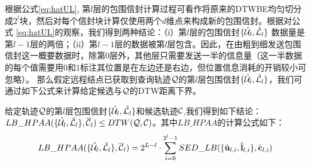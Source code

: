 根据公式\ref{eq:hatUL}, 第$l$层的包围信封计算过程可看作将原来的DTWBE均匀切分成$2^l$块，然后对每个信封块计算仅使用两个$d$维点来构成新的包围信封。根据对公式 \ref{eq:hatUL}的观察，我们得到两种结论：（i）第$l$层的包围信封$\{\hat{{\cal U}}_{l}, \hat{{\cal L}}_{l}\}$ 数据量是第$l-1$层的两倍；（ii）第$l-1$层的数据被第$l$层包含。因此，在由粗到细发送包围信封这一概要数据时，除第$0$层外，其他层只需要发送一半的信息量（这一半数据的每个值需要用0和1标注其位置是在左边还是右边，但位置信息消耗的开销较小可忽略）。
那么假定远程结点已获取到查询轨迹$\cal Q$的第$l$层包围信封$\{\hat{{\cal U}}_l,\hat{{\cal L}}_l\}$，我们可通过如下公式来计算给定候选与$\cal Q$的DTW距离下界。
\begin{theorem}\label{theo:HPAA}
	给定轨迹$\cal Q$的第$l$层包围信封$\{\hat{{\cal U}}_{l}, \hat{{\cal L}}_{l}\}$和候选轨迹$\cal C$,我们得到如下结论：
	 $LB\_HPAA({  \{\hat{{\cal U}_{l}}, \hat{{\cal L}_{l}}\},\overline{{\cal C}}_{l}}) \le DTW(\cal Q, \cal C)$。其中$LB\_HPAA$的计算公式如下：
	 \begin{eqnarray}\label{bound:HPAA}
	 LB\_HPAA({\{\hat{{\cal U}_{l}}, \hat{{\cal L}_{l}}\},\overline{{\cal C}}_{l}})= 2^{L-l} \cdot \sum_{i=0}^{2^{l}-1} SED\_LB(\{ \hat{\textbf{u}}_{l,i}, \hat{\textbf{l}}_{l,i} \}, \bar{\textbf{c}}_{l,i})
	 \end{eqnarray}
\end{theorem}
